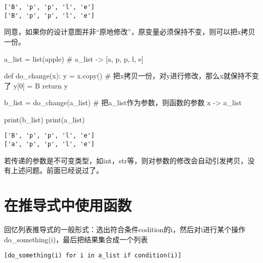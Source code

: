 \documentclass[
  letterpaper,
  DIV=11,
  numbers=noendperiod]{scrreprt}
\newenvironment{Shaded}{\begin{snugshade}}{\end{snugshade}}
\newcommand{\BuiltInTok}[1]{\textcolor[rgb]{0.00,0.23,0.31}{#1}}
\newcommand{\CommentTok}[1]{\textcolor[rgb]{0.37,0.37,0.37}{#1}}
\newcommand{\ControlFlowTok}[1]{\textcolor[rgb]{0.00,0.23,0.31}{#1}}
\newcommand{\DecValTok}[1]{\textcolor[rgb]{0.68,0.00,0.00}{#1}}
\newcommand{\KeywordTok}[1]{\textcolor[rgb]{0.00,0.23,0.31}{#1}}
\newcommand{\NormalTok}[1]{\textcolor[rgb]{0.00,0.23,0.31}{#1}}
\newcommand{\OperatorTok}[1]{\textcolor[rgb]{0.37,0.37,0.37}{#1}}
\newcommand{\StringTok}[1]{\textcolor[rgb]{0.13,0.47,0.30}{#1}}
\begin{document}
\begin{verbatim}
['B', 'p', 'p', 'l', 'e']
['B', 'p', 'p', 'l', 'e']
\end{verbatim}

同意，如果你的设计意图并非``原地修改''，原变量必须保持不变，则可以把x拷贝一份。

\begin{Shaded}
\begin{Highlighting}[]
\NormalTok{a\_list }\OperatorTok{=} \BuiltInTok{list}\NormalTok{(}\StringTok{\textquotesingle{}apple\textquotesingle{}}\NormalTok{) }\CommentTok{\# a\_list {-}\textgreater{} [\textquotesingle{}a\textquotesingle{}, \textquotesingle{}p\textquotesingle{}, \textquotesingle{}p\textquotesingle{}, \textquotesingle{}l\textquotesingle{}, \textquotesingle{}e\textquotesingle{}]}

\KeywordTok{def}\NormalTok{ do\_change(x):}
\NormalTok{    y }\OperatorTok{=}\NormalTok{ x.copy() }\CommentTok{\# 把x拷贝一份，对y进行修改，那么x就保持不变了}
\NormalTok{    y[}\DecValTok{0}\NormalTok{] }\OperatorTok{=} \StringTok{\textquotesingle{}B\textquotesingle{}}
    \ControlFlowTok{return}\NormalTok{ y}

\NormalTok{b\_list }\OperatorTok{=}\NormalTok{ do\_change(a\_list) }\CommentTok{\# 把a\_list作为参数，则函数的参数 x {-}\textgreater{} a\_list }

\BuiltInTok{print}\NormalTok{(b\_list)}
\BuiltInTok{print}\NormalTok{(a\_list)}
\end{Highlighting}
\end{Shaded}

\begin{verbatim}
['B', 'p', 'p', 'l', 'e']
['a', 'p', 'p', 'l', 'e']
\end{verbatim}

若传递的参数是不可变类型，如int，str等，则对参数的修改会自动引发拷贝，没有上述问题。前面已经说过了。

\hypertarget{ux5728ux63a8ux5bfcux5f0fux4e2dux4f7fux7528ux51fdux6570}{%
\section{在推导式中使用函数}\label{ux5728ux63a8ux5bfcux5f0fux4e2dux4f7fux7528ux51fdux6570}}

回忆列表推导式的一般形式：选出符合条件codition的i，然后对i进行某个操作do\_something(i)，最后把结果集合成一个列表

\texttt{{[}do\_something(i)\ for\ i\ in\ a\_list\ if\ condition(i){]}}
\end{document}
